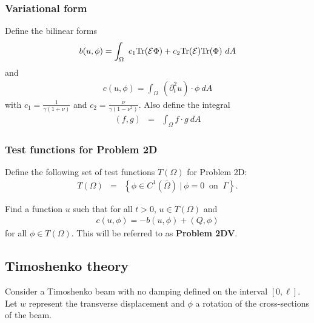 		\subsubsection*{Variational form}\label{ssec:2D_Model:VariationalForm}
			Define the bilinear forms
			\begin{eqnarray}
				b(u,\phi) = \int_\Omega~c_1\textrm{Tr}({\cal E}\Phi)+ c_2\textrm{Tr}({\cal E})
				\textrm{Tr}(\Phi) ~dA \label{eq:2D_Model:Bilinear}
			\end{eqnarray}
			and
			\begin{eqnarray}
				c(u,\phi) = \int_\Omega~ (\partial^2_t u) \cdot \phi~dA \label{eq:2D_Model:Bilinear_c}
			\end{eqnarray}
			with $\displaystyle c_1 = \frac{1}{\gamma(1+\nu)}$ and $\displaystyle c_2 = \frac{\nu}{\gamma(1-\nu^2)}$.
			Also define the integral
			\begin{eqnarray}
				(f,g) &=& \int_{\Omega} f\cdot g \ dA \label{eq:2D_Model:Bilinear_int}
			\end{eqnarray}

			\subsubsection*{Test functions for Problem 2D}\label{sssec:2D_Model:TestFunctions2D1}
			Define the following set of test functions $T(\Omega)$ for Problem 2D:
			\begin{eqnarray*}
				T(\Omega) & = & \left\{ \phi \in C^1(\bar{\Omega}) \ | \ \phi = 0 \ \textrm{ on } \ \Gamma \right\}. 
			\end{eqnarray*}\label{sym:baromega}

			Find a function $u$ such that for all $t>0$, $u \in T(\Omega)$ and 
			\begin{align}
				c(u,\phi) = -b(u,\phi) + (Q,\phi) \label{eq:2D_Model:Problem2D1VEq}
			\end{align}
			for all $\phi \in T(\Omega)$. This will be referred to as \textbf{Problem 2DV}.

	\subsection{Timoshenko theory}
		Consider a Timoshenko beam with no damping defined on the interval $[0,\ell]$.
		Let $w$ represent the transverse displacement and $\phi$ a rotation of the cross-sections of the beam.

